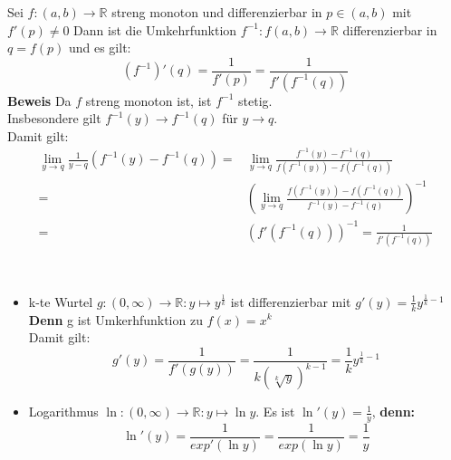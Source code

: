 \begin{Proposition}{
	Sei $f: \left(a,b\right) \rightarrow \mathbb{R}$ streng monoton und 
	differenzierbar in $p \in \left(a, b\right)$ mit $f'\left(p\right) \neq 0$
	Dann ist die Umkehrfunktion $f^{-1}: f\left(a,b\right) \rightarrow \mathbb{R}$
	differenzierbar in $q = f(p)$ und es gilt: 
	\begin{equation*}
		\left( f^{-1}\right)'\left(q\right) = \frac{1}{f'(p)} =
		 \frac{1}{f'(f^{-1}(q))}
	\end{equation*}
	\textbf{Beweis} Da $f$ streng monoton ist, ist $f^{-1}$  stetig. \\
	Insbesondere gilt $f^{-1}(y) \rightarrow f^{-1}(q)$ für $y \rightarrow q$.\\
	Damit gilt:
	\begin{align*}		
	 \lim\limits_{y \rightarrow q}
		{\frac{1}{y-q} \left( f^{-1}(y) - f^{-1}(q) \right) }
		= & \lim\limits_{y \rightarrow q}
		{\frac{f^{-1}(y) - f^{-1}(q)}{f(f^{-1}(y)) - f(f^{-1}(q)) }} \\
		= &\left( \lim\limits_{y \rightarrow q}
		{\frac{f(f^{-1}(y)) - f(f^{-1}(q))}
		{f^{-1}(y) - f^{-1}(q)} } \right)^{-1} \\
		= & \left(f'(f^{-1}(q))\right)^{-1}
		=  \frac{1}{f'\left( f^{-1}(q) \right)}		
	\end{align*}
}\end{Proposition}

\begin{Beispiel}{
	\textbf{ }\\
	\begin{itemize}
		\item k-te Wurtel $g: (0,\infty) \rightarrow \mathbb{R} : 
		y \mapsto y^{\frac{1}{k}}$ ist differenzierbar mit 
		$g'(y) = \frac{1}{k}y^{\frac{1}{k}-1}$
		\textbf{Denn} g ist Umkerhfunktion zu $f(x) = x^k$ \\
		Damit gilt: 
		\begin{equation*}g'(y) = \frac{1}{f'(g(y))} = \frac{1}{k(\sqrt[k]{y})^{k-1}}
		= \frac{1}{k}y^{\frac{1}{k} -1}
		\end{equation*}
		\item Logarithmus $\ln: (0,\infty) \rightarrow \mathbb{R}: 
		y \mapsto \ln y$. Es ist 
		$\ln'(y) = \frac{1}{y}$, \textbf{denn:}
		\begin{equation*}\ln'(y) = \frac{1}{exp'(\ln y)}
		= \frac{1}{exp(\ln y)} = \frac{1}{y}
		\end{equation*}
	\end{itemize}
}\end{Beispiel}


